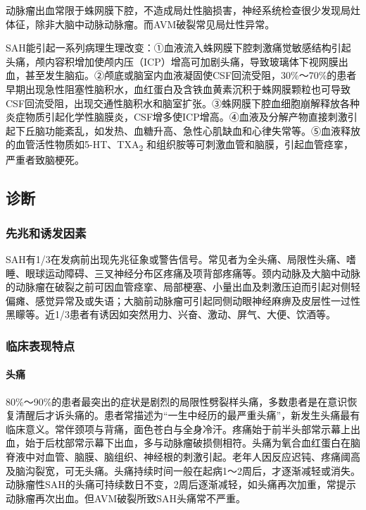 动脉瘤出血常限于蛛网膜下腔，不造成局灶性脑损害，神经系统检查很少发现局灶体征，除非大脑中动脉动脉瘤。而AVM破裂常见局灶性异常。

SAH能引起一系列病理生理改变：①血液流入蛛网膜下腔刺激痛觉敏感结构引起头痛，颅内容积增加使颅内压（ICP）增高可加剧头痛，导致玻璃体下视网膜出血，甚至发生脑疝。②颅底或脑室内血液凝固使CSF回流受阻，30\%～70\%的患者早期出现急性阻塞性脑积水，血红蛋白及含铁血黄素沉积于蛛网膜颗粒也可导致CSF回流受阻，出现交通性脑积水和脑室扩张。③蛛网膜下腔血细胞崩解释放各种炎症物质引起化学性脑膜炎，CSF增多使ICP增高。④血液及分解产物直接刺激引起下丘脑功能紊乱，如发热、血糖升高、急性心肌缺血和心律失常等。⑤血液释放的血管活性物质如5-HT、TXA\textsubscript{2}
和组织胺等可刺激血管和脑膜，引起血管痉挛，严重者致脑梗死。

\subsection{诊断}

\subsubsection{先兆和诱发因素}

SAH有1/3在发病前出现先兆征象或警告信号。常见者为全头痛、局限性头痛、嗜睡、眼球运动障碍、三叉神经分布区疼痛及项背部疼痛等。颈内动脉及大脑中动脉的动脉瘤在破裂之前可因血管痉挛、局部梗塞、小量出血及刺激压迫而引起对侧轻偏瘫、感觉异常及或失语；大脑前动脉瘤可引起同侧动眼神经麻痹及皮层性一过性黑矇等。近1/3患者有诱因如突然用力、兴奋、激动、屏气、大便、饮酒等。

\subsubsection{临床表现特点}

\paragraph{头痛}

80\%～90\%的患者最突出的症状是剧烈的局限性劈裂样头痛，多数患者是在意识恢复清醒后才诉头痛的。患者常描述为“一生中经历的最严重头痛”，新发生头痛最有临床意义。常伴颈项与背痛，面色苍白与全身冷汗。疼痛始于前半头部常示幕上出血，始于后枕部常示幕下出血，多与动脉瘤破损侧相符。头痛为氧合血红蛋白在脑脊液中对血管、脑膜、脑组织、神经根的刺激引起。老年人因反应迟钝、疼痛阈高及脑沟裂宽，可无头痛。头痛持续时间一般在起病1～2周后，才逐渐减轻或消失。动脉瘤性SAH的头痛可持续数日不变，2周后逐渐减轻，如头痛再次加重，常提示动脉瘤再次出血。但AVM破裂所致SAH头痛常不严重。

